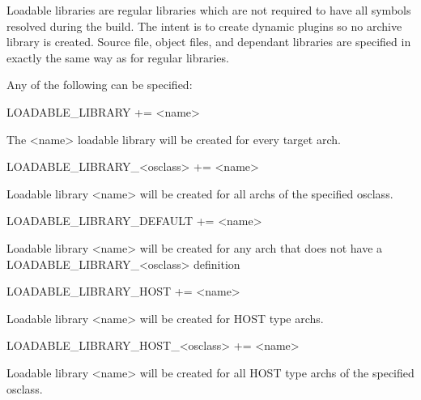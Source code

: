 Loadable libraries are regular libraries which are not required to have all symbols resolved during the build. The intent is 
to create dynamic plugins so no archive library is created. Source file, object files, and dependant libraries are specified in 
exactly the same way as for regular libraries.

Any of the following can be specified:

\begin{description}\item {}LOADABLE\_LIBRARY += \textless{}name\textgreater{}

\end{description}The \textless{}name\textgreater{} loadable library will be created for every target arch.

\begin{description}\item LOADABLE\_LIBRARY\_\textless{}osclass\textgreater{} += \textless{}name\textgreater{}

\end{description}Loadable library \textless{}name\textgreater{} will be created for all archs of the specified osclass.

\begin{description}\item LOADABLE\_LIBRARY\_DEFAULT += \textless{}name\textgreater{}

\end{description}Loadable library \textless{}name\textgreater{} will be created for any arch that does not have a 
LOADABLE\_LIBRARY\_\textless{}osclass\textgreater{} definition



\begin{description}\item {}LOADABLE\_LIBRARY\_HOST += \textless{}name\textgreater{}

\end{description}Loadable library \textless{}name\textgreater{} will be created for HOST type archs.

\begin{description}\item LOADABLE\_LIBRARY\_HOST\_\textless{}osclass\textgreater{} += \textless{}name\textgreater{}

\end{description}Loadable library \textless{}name\textgreater{} will be created for all HOST type archs of the specified osclass.

